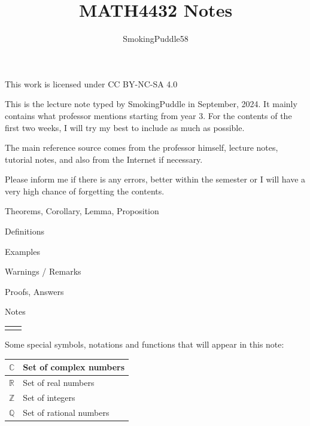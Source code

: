 \documentclass{article}
\title{MATH4432 Notes}
\author{SmokingPuddle58}
\theoremstyle{MyNonumberplain}
\theoremstyle{break}
\newcommand{\R}{\mathbb{R}}
\newcommand{\Q}{\mathbb{Q}}
\newcommand{\Z}{\mathbb{Z}}
\newcommand{\C}{\mathbb{C}}
\theoremstyle{break}
\begin{document}
\maketitle

\begin{center}
    This work is licensed under CC BY-NC-SA 4.0
\end{center}


\newpage

    This is the lecture note typed by SmokingPuddle in September, 2024. It mainly contains what professor mentions starting from year 3. For the contents of the first two weeks, I will try my best to include as much as possible. 

    The main reference source comes from the professor himself, lecture notes, tutorial notes, and also from the Internet if necessary.

    Please inform me if there is any errors, better within the semester or I will have a very high chance of forgetting the contents. 

    \bigskip


\begin{thmbox}
    Theorems, Corollary, Lemma, Proposition
\end{thmbox}

\begin{defbox}
    Definitions
\end{defbox}

\begin{expbox}
    Examples
\end{expbox}

\begin{warnbox}
    Warnings / Remarks
\end{warnbox}

\begin{prfbox}
    Proofs, Answers
\end{prfbox}

\begin{notebox}
    Notes
\end{notebox}

\begin{tabular}{ll}
    &\\
\end{tabular}

Some special symbols, notations and functions that will appear in this note:\bigskip

\begin{center}

    \begin{tabular}{|l|l|}
        \hline
        $\C$ & Set of complex numbers \\ \hline
        $\R$ & Set of real numbers \\ \hline
        $\Z$ & Set of integers \\ \hline
        $\Q$ & Set of rational numbers \\ \hline
    \end{tabular}
\end{center}
\begin{center}
    

\end{center}
\end{document}
